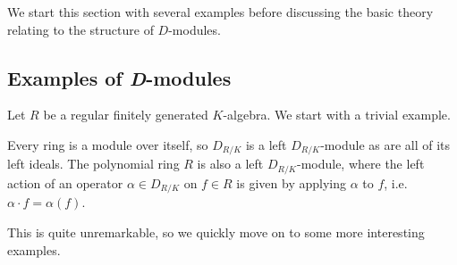 We start this section with several examples before discussing the basic theory relating to the structure of $D$-modules.

\subsection{Examples of \emph{D}-modules}

Let $R$ be a regular finitely generated $K$-algebra. We start with a trivial example.

\begin{example}\label{example:d-mod-trivial-ring-case}
	Every ring is a module over itself, so $D_{R/K}$ is a left $D_{R/K}$-module as are all of its left ideals. The polynomial ring $R$ is also a left $D_{R/K}$-module, where the left action of an operator $\alpha \in D_{R/K}$ on $f \in R$ is given by applying $\alpha$ to $f$, i.e. $\alpha\cdot f = \alpha(f)$. 
\end{example}

This is quite unremarkable, so we quickly move on to some more interesting examples.

